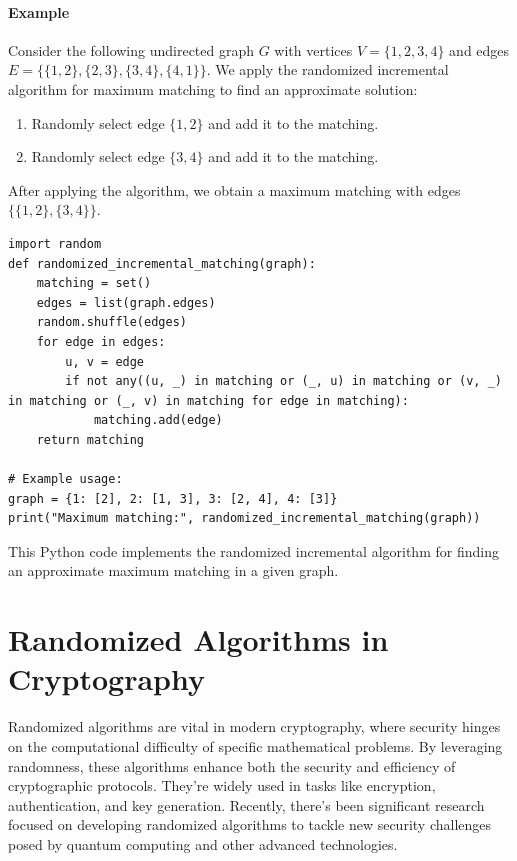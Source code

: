 \documentclass[12pt]{book} %
\begin{document}
\paragraph{Example}
Consider the following undirected graph \(G\) with vertices \(V = \{1, 2, 3, 4\}\) and edges \(E = \{\{1, 2\}, \{2, 3\}, \{3, 4\}, \{4, 1\}\}\). We apply the randomized incremental algorithm for maximum matching to find an approximate solution:

\begin{enumerate}
    \item Randomly select edge \(\{1, 2\}\) and add it to the matching.
    \item Randomly select edge \(\{3, 4\}\) and add it to the matching.
\end{enumerate}

After applying the algorithm, we obtain a maximum matching with edges $\{\{1, 2\}, \{3, 4\}\}$.

\FloatBarrier
\begin{lstlisting}
import random
def randomized_incremental_matching(graph):
    matching = set()
    edges = list(graph.edges)
    random.shuffle(edges)
    for edge in edges:
        u, v = edge
        if not any((u, _) in matching or (_, u) in matching or (v, _) in matching or (_, v) in matching for edge in matching):
            matching.add(edge)
    return matching

# Example usage:
graph = {1: [2], 2: [1, 3], 3: [2, 4], 4: [3]}
print("Maximum matching:", randomized_incremental_matching(graph))
\end{lstlisting}
\FloatBarrier

This Python code implements the randomized incremental algorithm for finding an approximate maximum matching in a given graph.

\section{Randomized Algorithms in Cryptography}

Randomized algorithms are vital in modern cryptography, where security hinges on the computational difficulty of specific mathematical problems. By leveraging randomness, these algorithms enhance both the security and efficiency of cryptographic protocols. They're widely used in tasks like encryption, authentication, and key generation. Recently, there's been significant research focused on developing randomized algorithms to tackle new security challenges posed by quantum computing and other advanced technologies.
\end{document}
